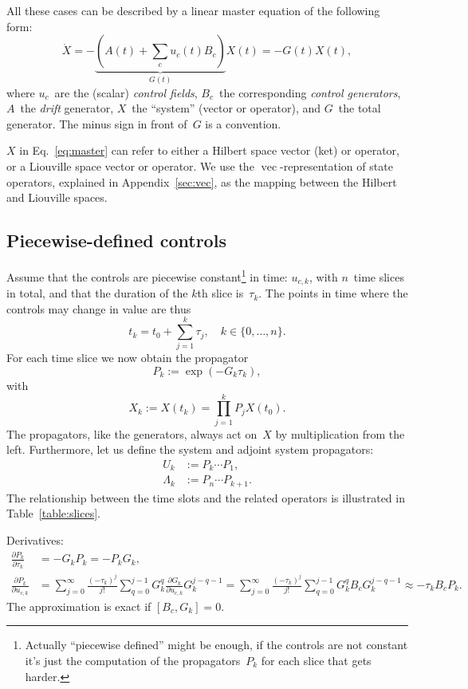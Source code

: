 \documentclass[aps, pra, a4paper, longbibliography]{revtex4}
\newcommand{\be}{\begin{equation}}
\newcommand{\ee}{\end{equation}}
\newcommand{\comm}[2]{\left[ #1, #2 \right]}
\DeclareMathOperator{\cvec}{vec}
\newcommand{\dd}[2]{\frac{\partial #1}{\partial #2}}
\begin{document}
All these cases can be described by a linear master equation of the following form:
\be
\label{eq:master}
\dot{X} = -\underbrace{(A(t) +\sum_{c} u_c(t) B_c)}_{G(t)} X(t) = -G(t) X(t),
\ee
where $u_c$~are the (scalar) \emph{control fields}, $B_c$~the
corresponding \emph{control generators},
$A$~the \emph{drift} generator, $X$~the ``system'' (vector or operator), and $G$~the total generator.
The minus sign in front of~$G$ is a convention.

$X$ in Eq.~\eqref{eq:master} can refer to either a Hilbert space
vector (ket) or operator, or a Liouville space vector
or operator.
We use the $\cvec$-representation of state
operators, explained in Appendix~\ref{sec:vec},
as the mapping between the Hilbert and Liouville spaces.

\subsection{Piecewise-defined controls}

Assume that the controls are
piecewise constant\footnote{Actually ``piecewise defined'' might be
  enough, if the controls are not constant it's just the computation
  of the propagators~$P_k$ for each slice that gets harder.}
in time: $u_{c, k}$, with $n$~time slices in total,
and that the duration of the $k$th slice is~$\tau_k$.
The points in time where the controls may change in value are thus
\be
t_k = t_0 + \sum_{j=1}^{k} \tau_j, \quad k \in \{0, \ldots, n\}.
\ee
For each time slice we now obtain the propagator
\be
P_k := \exp(-G_k \tau_k),
\ee
with
\be
\label{eq:Xn}
X_k := X(t_k) = \prod_{j=1}^{k} P_j X(t_0).
\ee
The propagators, like the generators, always act on~$X$ by multiplication
from the left.
Furthermore, let us define the system and adjoint system propagators:
\begin{align}
U_k &:= P_k \cdots P_1,\\      %
\Lambda_k &:= P_n \cdots P_{k+1}.
\end{align}
The relationship between the time slots and the related operators is
illustrated in Table~\ref{table:slices}.


Derivatives:
\begin{align}
\dd{P_k}{\tau_k}  &= -G_k P_k = -P_k G_k,\\
\dd{P_k}{u_{c,k}}
&=
\sum_{j=0}^{\infty} \frac{(-\tau_k)^j}{j!}
\sum_{q=0}^{j-1}
G_k^{q} \dd{G_k}{u_{c,k}} G_k^{j-q-1}
=
\sum_{j=0}^{\infty} \frac{(-\tau_k)^j}{j!}
\sum_{q=0}^{j-1}
G_k^{q} B_c G_k^{j-q-1}
\approx -\tau_k B_c P_k.
\end{align}
The approximation is exact if $\comm{B_c}{G_k} = 0$.
\end{document}
